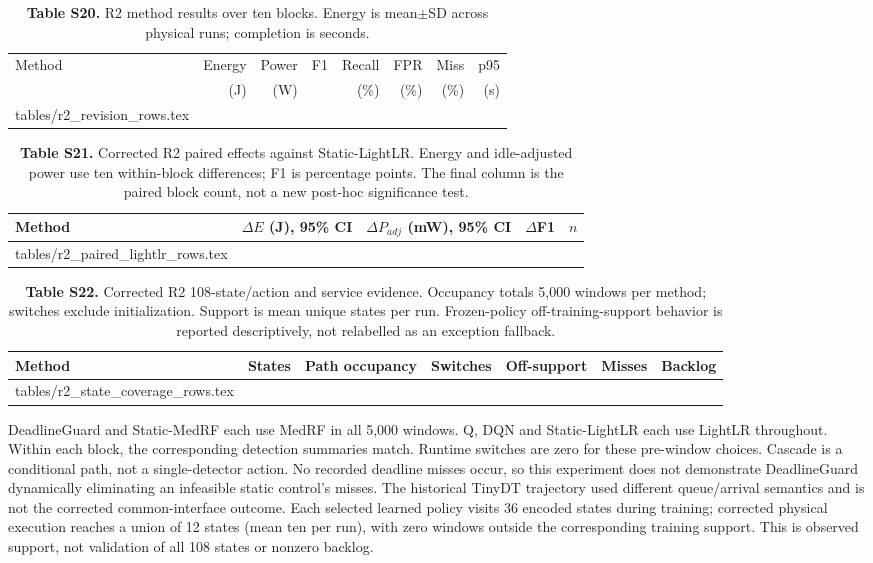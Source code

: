 \documentclass[10pt,a4paper]{article}
\makeatletter
\newcommand{\tableinput}[1]{\@@input #1.tex }
\makeatother
\begin{document}
\begin{table}[h!]
\centering\footnotesize
\caption*{\textbf{Table S20.} R2 method results over ten blocks. Energy is mean$\pm$SD across physical runs; completion is seconds.}
\setlength{\tabcolsep}{2.6pt}
\begin{tabular}{lrrrrrrr}\toprule
Method & Energy & Power & F1 & Recall & FPR & Miss & p95\\
 & (J) & (W) & & (\%) & (\%) & (\%) & (s)\\\midrule
\tableinput{tables/r2_revision_rows}
\bottomrule\end{tabular}
\end{table}

\begin{table}[h!]
\centering\scriptsize
\caption*{\textbf{Table S21.} Corrected R2 paired effects against Static-LightLR. Energy and idle-adjusted power use ten within-block differences; F1 is percentage points. The final column is the paired block count, not a new post-hoc significance test.}
\setlength{\tabcolsep}{2.5pt}
\begin{tabular}{lrrrr}\toprule
Method & $\Delta E$ (J), 95\% CI & $\Delta P_{adj}$ (mW), 95\% CI & $\Delta$F1 & $n$\\\midrule
\tableinput{tables/r2_paired_lightlr_rows}
\bottomrule\end{tabular}
\end{table}

\begin{table}[h!]
\centering\scriptsize
\caption*{\textbf{Table S22.} Corrected R2 108-state/action and service evidence. Occupancy totals 5,000 windows per method; switches exclude initialization. Support is mean unique states per run. Frozen-policy off-training-support behavior is reported descriptively, not relabelled as an exception fallback.}
\setlength{\tabcolsep}{2.2pt}
\begin{tabular}{lrlrrrr}\toprule
Method & States & Path occupancy & Switches & Off-support & Misses & Backlog\\\midrule
\tableinput{tables/r2_state_coverage_rows}
\bottomrule\end{tabular}
\end{table}

DeadlineGuard and Static-MedRF each use MedRF in all 5,000 windows. Q, DQN and Static-LightLR each use LightLR throughout. Within each block, the corresponding detection summaries match. Runtime switches are zero for these pre-window choices. Cascade is a conditional path, not a single-detector action. No recorded deadline misses occur, so this experiment does not demonstrate DeadlineGuard dynamically eliminating an infeasible static control's misses. The historical TinyDT trajectory used different queue/arrival semantics and is not the corrected common-interface outcome. Each selected learned policy visits 36 encoded states during training; corrected physical execution reaches a union of 12 states (mean ten per run), with zero windows outside the corresponding training support. This is observed support, not validation of all 108 states or nonzero backlog.
\end{document}
